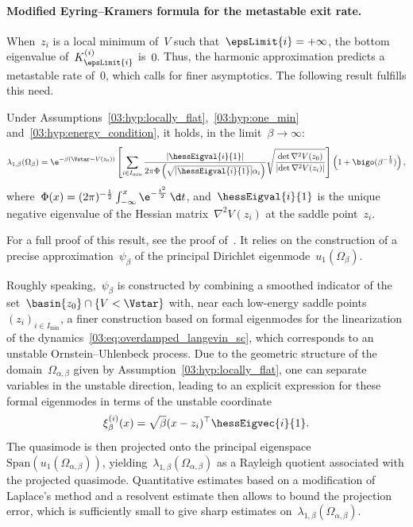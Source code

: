     \paragraph{Modified Eyring--Kramers formula for the metastable exit rate.}
    When~$z_i$ is a local minimum of~$V$ such that~$\epsLimit{i}=+\infty$, the bottom eigenvalue of~$K_{\epsLimit{i}}^{(i)}$ is~$0$. Thus, the harmonic approximation predicts a metastable rate of~$0$, which calls for finer asymptotics.
    The following result fulfills this need.
    \begin{theorem}
        \label{03:thm:eyring_kramers}
        Under Assumptions~\ref{03:hyp:locally_flat},~\ref{03:hyp:one_min} and~\ref{03:hyp:energy_condition},
        it holds, in the limit~$\beta\to\infty$:
        \begin{equation}
            \label{03:eq:eyring_kramers}
            \lambda_{1,\beta}(\Omega_{\beta}) = \e^{-\beta\left(\Vstar-V(z_0)\right)} \left[\sum_{i\in I_{\min}} \frac{|\hessEigval{i}{1}|}{2\pi\Phi\left(\sqrt{|\hessEigval{i}{1}|}\alpha_i\right)}\sqrt{\frac{\det \nabla^2 V(z_0)}{\left|\det \nabla ^2 V(z_i)\right|}}\right]\left(1 +\bigo(\beta^{-\frac12})\right),
        \end{equation}
        where~$\Phi(x)=(2\pi)^{-\frac12}\int_{-\infty}^x\e^{-\frac{t^2}2}\,\d t$, and~$\hessEigval{i}{1}$ is the unique negative eigenvalue of the Hessian matrix~$\nabla^2 V(z_i)$ at the saddle point~$z_i$.
    \end{theorem}
    For a full proof of this result, see the proof of~\cite[Theorem 5]{BLS25a}. It relies on the construction of a precise approximation~$\psi_\beta$ of the principal Dirichlet eigenmode~$u_1(\Omega_\beta)$.
    
    Roughly speaking,~$\psi_\beta$ is constructed by combining a smoothed indicator of the set~$\basin{z_0}\cap \{V<\Vstar\}$ with, near each low-energy saddle points~$(z_i)_{i\in I_{\min}}$, a finer construction based on formal eigenmodes for the linearization of the dynamics~\eqref{03:eq:overdamped_langevin_sc}, which corresponds to an unstable Ornstein--Uhlenbeck process.
    Due to the geometric structure of the domain~$\Omega_{\alpha,\beta}$ given by Assumption~\ref{03:hyp:locally_flat}, one can separate variables in the unstable direction, leading to an explicit expression for these formal eigenmodes in terms of the unstable coordinate
    $$\xi_\beta^{(i)}(x) = \sqrt{\beta}(x-z_i)^\top \hessEigvec{i}{1}.$$
    The quasimode is then projected onto the principal eigenspace~$\mathrm{Span}(u_1(\Omega_{\alpha,\beta}))$, yielding~$\lambda_{1,\beta}(\Omega_{\alpha,\beta})$ as a Rayleigh quotient associated with the projected quasimode. Quantitative estimates based on a modification of Laplace's method and a resolvent estimate then allows to bound the projection error, which is sufficiently small to give sharp estimates on~$\lambda_{1,\beta}(\Omega_{\alpha,\beta})$.

